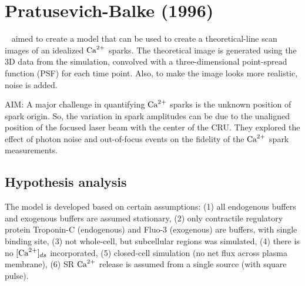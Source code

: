 \section{Pratusevich-Balke (1996)}
\label{sec:prat-balke-1996} 


~\citep{pratusevich1996} aimed to create a model that can be used to create a
theoretical-line scan images of an idealized ${\text{Ca}^{2+}}$ sparks.
The theoretical image is generated using the 3D data from the simulation,
convolved with a three-dimensional point-spread function (PSF) for each time
point. Also, to make the image looks more realistic, noise is added.

AIM: A major challenge in quantifying ${\text{Ca}^{2+}}$ sparks is the unknown position of
spark origin. So, the variation in spark amplitudes can be due to the unaligned
position of the focused laser beam with the center of the CRU. They explored the
effect of photon noise and out-of-focus events on the fidelity of the ${\text{Ca}^{2+}}$
spark measurements.


\subsection{Hypothesis analysis}
\label{sec:hypothesis-analysis-12}

The model is developed based on certain assumptions:
(1) all endogenous buffers and exogenous buffers are assumed stationary, (2)
only contractile regulatory protein Troponin-C (endogenous) and Fluo-3
(exogenous) are buffers, with single binding site, (3) not whole-cell, but
subcellular regions was simulated, (4) there is no $[{\text{Ca}^{2+}}]_{ds}$ incorporated,
(5) closed-cell simulation (no net flux across plasma membrane), (6) SR ${\text{Ca}^{2+}}$
release is assumed from a single source (with square pulse).
 
%  
% 

